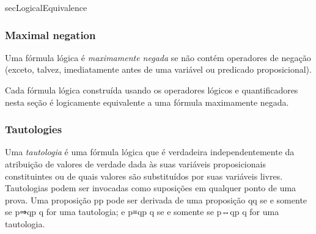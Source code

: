 \begin{tldr}{secLogicalEquivalence}
\subsubsection*{Maximal negation}

\begin{tldrlist}
Uma fórmula lógica é \textit{maximamente negada} se não contém operadores de negação (exceto, talvez, imediatamente antes de uma variável ou predicado proposicional).

Cada fórmula lógica construída usando os operadores lógicos e quantificadores nesta seção é logicamente equivalente a uma fórmula maximamente negada.
\end{tldrlist}

\subsubsection*{Tautologies}

\begin{tldrlist}
Uma \textit{tautologia} é uma fórmula lógica que é verdadeira independentemente da atribuição de valores de verdade dada às suas variáveis ​​proposicionais constituintes ou de quais valores são substituídos por suas variáveis ​​livres. Tautologias podem ser invocadas como suposições em qualquer ponto de uma prova.
Uma proposição pp pode ser derivada de uma proposição qq se e somente se p⇒qp \Rightarrow q for uma tautologia; e p≡qp \equiv q se e somente se p⇔qp \Leftrightarrow q for uma tautologia.
\end{tldrlist}
\end{tldr}
